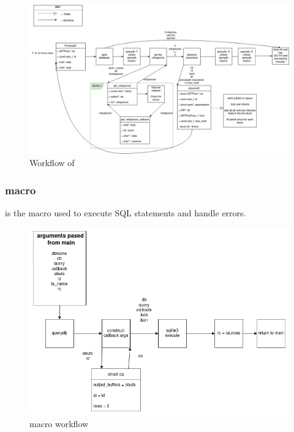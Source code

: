 \begin{figure} [H]
  \centering
  \includegraphics[width=\textwidth]{images/gufi_query_processdir.png}
  \caption{Workflow of \processdir}
\end{figure}

\subsubsection{\querydb macro}
\querydb is the macro used to execute SQL statements and handle errors.

\begin{figure} [H]
  \centering
  \includegraphics[width=\textwidth]{images/querydb_macro.png}
  \caption{\querydb macro workflow}
\end{figure}
